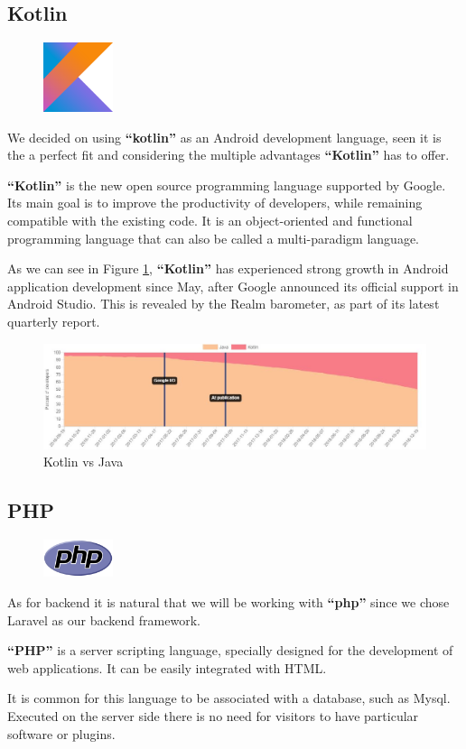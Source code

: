 \documentclass[12pt,a4paper]{report}
\begin{document}
	\subsection{Kotlin}
	\begin{figure}
		\centering
		\includegraphics[width=0.8in]{kotlin-logo.png}	
	\end{figure}
	We decided on using \textbf{``kotlin''} as an Android development language, seen it is the a perfect fit and considering the multiple advantages \textbf{``Kotlin''} has to offer.\par 
	\textbf{``Kotlin''} is the new open source programming language supported by Google. Its main goal is to improve the productivity of developers, while remaining compatible with the existing code. It is an object-oriented and functional programming language that can also be called a multi-paradigm language.\par 
	As we can see in Figure \ref{kotlin-label}, \textbf{``Kotlin''} has experienced strong growth in Android application development since May, after Google announced its official support in Android Studio. This is revealed by the Realm barometer, as part of its latest quarterly report.
	\begin{figure}[H]
		\centering
		\includegraphics[width=7in,keepaspectratio]{kotlinjava.jpg}
		\caption{ Kotlin vs Java\protect{}\protect\footnotemark[\thefootnote]}
		
		\label{kotlin-label}
	\end{figure}
	\subsection{PHP}
	\begin{figure}
		\centering
		\includegraphics[width=0.8in]{PHP-logo.png}	
	\end{figure}
	As for backend it is natural that we will be working with \textbf{``\ac{php}''} since we chose Laravel as our backend framework.\par 
	\textbf{``PHP''} is a server scripting language, specially designed for the development of web applications. It can be easily integrated with HTML. \par 
	It is common for this language to be associated with a database, such as My\ac{sql}. Executed on the server side there is no need for visitors to have particular software or plugins.
\end{document}
